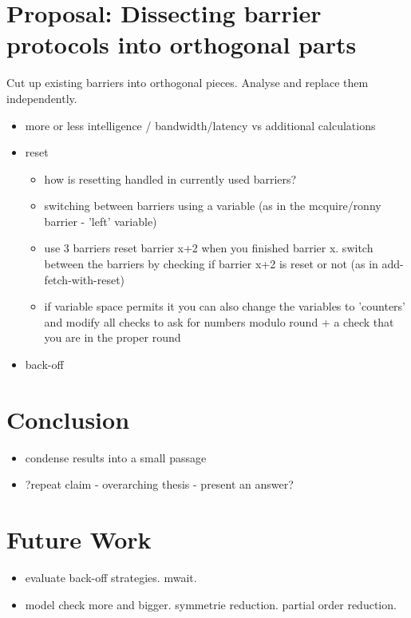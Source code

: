 \documentclass[a4paper, 10pt]{article}
\begin{document}
\section{Proposal: Dissecting barrier protocols into orthogonal parts}
Cut up existing barriers into orthogonal pieces. Analyse and replace them independently.
\begin{itemize}
	\item more or less intelligence / bandwidth/latency vs additional calculations
	\item 
		reset

		\begin{itemize}
			\item how is resetting handled in currently used barriers?
			\item switching between barriers using a variable (as in the mcquire/ronny barrier - 'left' variable)
			\item use 3 barriers reset barrier x+2 when you finished barrier x. switch between the barriers by checking if barrier x+2 is reset or not (as in add-fetch-with-reset)
			\item if variable space permits it you can also change the variables to 'counters' and modify all checks to ask for numbers modulo round + a check that you are in the proper round
		\end{itemize}

	\item back-off
\end{itemize}

\section{Conclusion}
\begin{itemize}
	\item condense results into a small passage
	\item ?repeat claim - overarching thesis - present an answer?
\end{itemize}

\section{Future Work}
\begin{itemize}
	\item evaluate back-off strategies. mwait.
	\item model check more and bigger. symmetrie reduction. partial order reduction.
\end{itemize}
\end{document}
